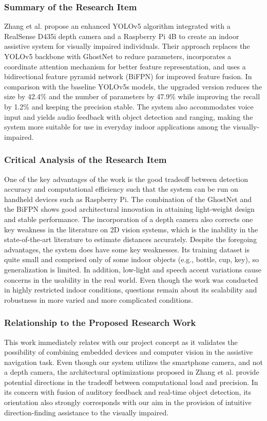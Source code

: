 \documentclass{FastFyp}
\begin{document}
\subsubsection{Summary of the Research Item}  
Zhang et al. \cite{ref:zhang2024improved} propose an enhanced YOLOv5 algorithm integrated with a RealSense D435i depth camera and a Raspberry Pi 4B to create an indoor assistive system for visually impaired individuals. Their approach replaces the YOLOv5 backbone with GhostNet to reduce parameters, incorporates a coordinate attention mechanism for better feature representation, and uses a bidirectional feature pyramid network (BiFPN) for improved feature fusion. In comparison with the baseline YOLOv5s models, the upgraded version reduces the size by 42.4\% and the number of parameters by 47.9\% while improving the recall by 1.2\% and keeping the precision stable. The system also accommodates voice input and yields audio feedback with object detection and ranging, making the system more suitable for use in everyday indoor applications among the visually-impaired.

\subsubsection{Critical Analysis of the Research Item}  
One of the key advantages of the work is the good tradeoff between detection accuracy and computational efficiency such that the system can be run on handheld devices such as Raspberry Pi. The combination of the GhostNet and the BiFPN shows good architectural innovation in attaining light-weight design and stable performance. The incorporation of a depth camera also corrects one key weakness in the literature on 2D vision systems, which is the inability in the state-of-the-art literature to estimate distances accurately. Despite the foregoing advantages, the system does have some key weaknesses. Its training dataset is quite small and comprised only of some indoor objects (e.g., bottle, cup, key), so generalization is limited. In addition, low-light and speech accent variations cause concerns in the usability in the real world. Even though the work was conducted in highly restricted indoor conditions, questions remain about its scalability and robustness in more varied and more complicated conditions.

\subsubsection{Relationship to the Proposed Research Work}  
This work immediately relates with our project concept as it validates the possibility of combining embedded devices and computer vision in the assistive navigation task. Even though our system utilizes the smartphone camera, and not a depth camera, the architectural optimizations proposed in Zhang et al. \cite{ref:zhang2024improved}  provide potential directions in the tradeoff between computational load and precision. In its concern with fusion of auditory feedback and real-time object detection, its orientation also strongly corresponds with our aim in the provision of intuitive direction-finding assistance to the visually impaired.
\end{document}
